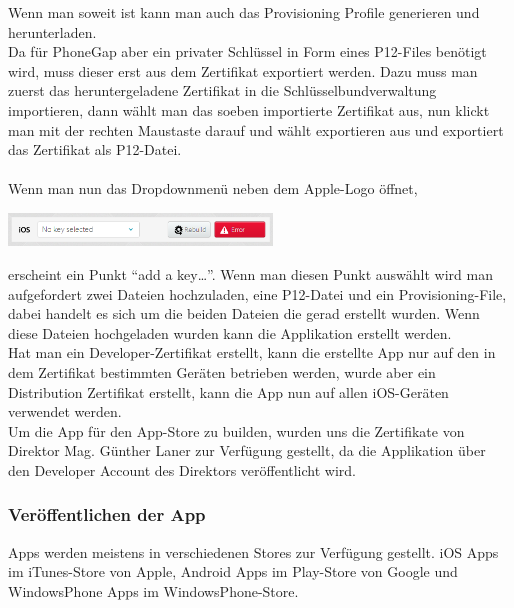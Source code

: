 Wenn man soweit ist kann man auch das Provisioning Profile generieren und herunterladen.\\
Da für PhoneGap aber ein privater Schlüssel in Form eines P12-Files benötigt wird, muss dieser erst aus dem Zertifikat exportiert werden. Dazu muss man zuerst das heruntergeladene Zertifikat in die Schlüsselbundverwaltung importieren, dann wählt man das soeben importierte Zertifikat aus, nun klickt man mit der rechten Maustaste darauf und wählt exportieren aus und exportiert das Zertifikat als P12-Datei.\\
\\
Wenn man nun das Dropdownmenü neben dem Apple-Logo öffnet,

\includegraphics[keepaspectratio=true, width=7cm]{images/phoneGap/PhoneGap4.png}

erscheint ein Punkt \enquote{add a key…}. Wenn man diesen Punkt auswählt wird man aufgefordert zwei Dateien hochzuladen, eine P12-Datei und ein Provisioning-File, dabei handelt es sich um die beiden Dateien die gerad erstellt wurden. Wenn diese Dateien hochgeladen wurden kann die Applikation erstellt werden.\\
Hat man ein Developer-Zertifikat erstellt, kann die erstellte App nur auf den in dem Zertifikat bestimmten Geräten betrieben werden, wurde aber ein Distribution Zertifikat erstellt, kann die App nun auf allen iOS-Geräten verwendet werden.\\
Um die App für den App-Store zu builden, wurden uns die Zertifikate von Direktor Mag. Günther Laner zur Verfügung gestellt, da die Applikation über den Developer Account des Direktors veröffentlicht wird.\\



\subsubsection{Veröffentlichen der App}

Apps werden meistens in verschiedenen Stores zur Verfügung gestellt. iOS Apps im iTunes-Store von Apple, Android Apps im Play-Store von Google und WindowsPhone Apps im WindowsPhone-Store.\\
